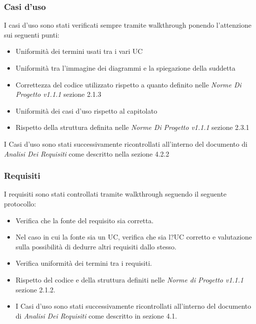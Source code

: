 \documentclass[a4paper]{article}
\begin{document}
			\subsubsection{Casi d'uso}
				I casi d'uso sono stati verificati sempre tramite walkthrough ponendo l'attenzione sui seguenti punti:
				\begin{itemize}
					\item Uniformità dei termini usati tra i vari UC
					\item Uniformità tra l'immagine dei diagrammi e la spiegazione della suddetta
					\item Correttezza del codice utilizzato rispetto a quanto definito nelle \emph{Norme Di Progetto v1.1.1} sezione
					2.1.3
					\item Uniformità dei casi d'uso rispetto al capitolato
					\item Rispetto della struttura definita nelle \emph{Norme Di Progetto v1.1.1} sezione 2.3.1
				\end{itemize}

				I Casi d'uso sono stati successivamente ricontrollati all'interno del documento di \emph{Analisi Dei Requisiti} come
				descritto nella sezione 4.2.2
			\subsubsection{Requisiti}
				I requisiti sono stati controllati tramite walkthrough seguendo il seguente protocollo:
					\begin{itemize}
						\item Verifica che la fonte del requisito sia corretta.
						\item Nel caso in cui la fonte sia un UC, verifica che sia l?UC corretto e valutazione
	 sulla possibilità di dedurre altri requisiti dallo stesso.
						\item Verifica uniformità dei termini tra i requisiti.
						\item Rispetto del codice e della struttura definiti nelle \emph{Norme di Progetto v1.1.1} sezione 2.1.2.
						\item I Casi d'uso sono stati successivamente ricontrollati all'interno del documento di \emph{Analisi Dei Requisiti} 
						come descritto in sezione 4.1.
					\end{itemize}
\end{document}
